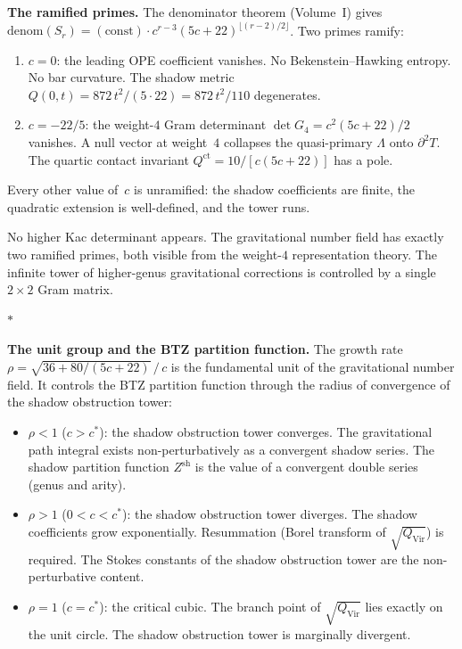 \documentclass[11pt]{article}
\newcommand{\sep}{\bigskip\begin{center}$*$\end{center}\medskip}
\begin{document}
\noindent\textbf{The ramified primes.}\enspace
The denominator theorem (Volume~I) gives
$\mathrm{denom}(S_r)
= (\mathrm{const})\cdot c^{r-3}(5c{+}22)^{\lfloor(r-2)/2\rfloor}$.
Two primes ramify:
\begin{enumerate}[label=(\roman*),nosep]
\item $c = 0$: the leading OPE coefficient vanishes.  No
  Bekenstein--Hawking entropy.  No bar curvature.  The shadow
  metric $Q(0,t) = 872\,t^2/(5 \cdot 22) = 872\,t^2/110$
  degenerates.
\item $c = -22/5$: the weight-$4$ Gram determinant
  $\det G_4 = c^2(5c{+}22)/2$ vanishes.  A null vector at
  weight~$4$ collapses the quasi-primary $\Lambda$ onto
  $\partial^2 T$.  The quartic contact invariant
  $Q^{\mathrm{ct}} = 10/[c(5c{+}22)]$ has a pole.
\end{enumerate}
Every other value of~$c$ is unramified: the shadow
coefficients are finite, the quadratic extension is
well-defined, and the tower runs.

No higher Kac determinant appears.  The gravitational number
field has exactly two ramified primes, both visible from the
weight-$4$ representation theory.  The infinite tower of
higher-genus gravitational corrections is controlled by a
single $2 \times 2$ Gram matrix.

\sep

\noindent\textbf{The unit group and the BTZ partition function.}\enspace
The growth rate
$\rho = \sqrt{36 + 80/(5c{+}22)}\,/\,c$ is the fundamental
unit of the gravitational number field.  It controls the BTZ
partition function through the radius of convergence of the
shadow obstruction tower:
\begin{itemize}[nosep]
\item $\rho < 1$ ($c > c^*$): the shadow obstruction tower converges.  The
  gravitational path integral exists non-perturbatively as a
  convergent shadow series.  The shadow partition function
  $Z^{\mathrm{sh}}$ is the value of a convergent double series
  (genus and arity).
\item $\rho > 1$ ($0 < c < c^*$): the shadow obstruction tower diverges.
  The shadow coefficients grow exponentially.  Resummation
  (Borel transform of $\sqrt{Q_{\mathrm{Vir}}}$) is required.
  The Stokes constants of the shadow obstruction tower are the
  non-perturbative content.
\item $\rho = 1$ ($c = c^*$): the critical cubic.  The branch
  point of $\sqrt{Q_{\mathrm{Vir}}}$ lies exactly on the unit
  circle.  The shadow obstruction tower is marginally divergent.
\end{itemize}
\end{document}
